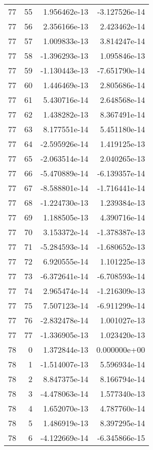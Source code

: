 \begin{tabular}{rrrr}
  77 &   55 &  1.956462e-13 & -3.127526e-14 \\
  77 &   56 &  2.356166e-13 &  2.423462e-14 \\
  77 &   57 &  1.009833e-13 &  3.814247e-14 \\
  77 &   58 & -1.396293e-13 &  1.095846e-13 \\
  77 &   59 & -1.130443e-13 & -7.651790e-14 \\
  77 &   60 &  1.446469e-13 &  2.805686e-14 \\
  77 &   61 &  5.430716e-14 &  2.648568e-14 \\
  77 &   62 &  1.438282e-13 &  8.367491e-14 \\
  77 &   63 &  8.177551e-14 &  5.451180e-14 \\
  77 &   64 & -2.595926e-14 &  1.419125e-13 \\
  77 &   65 & -2.063514e-14 &  2.040265e-13 \\
  77 &   66 & -5.470889e-14 & -6.139357e-14 \\
  77 &   67 & -8.588801e-14 & -1.716441e-14 \\
  77 &   68 & -1.224730e-13 &  1.239384e-13 \\
  77 &   69 &  1.188505e-13 &  4.390716e-14 \\
  77 &   70 &  3.153372e-14 & -1.378387e-13 \\
  77 &   71 & -5.284593e-14 & -1.680652e-13 \\
  77 &   72 &  6.920555e-14 &  1.101225e-13 \\
  77 &   73 & -6.372641e-14 & -6.708593e-14 \\
  77 &   74 &  2.965474e-14 & -1.216309e-13 \\
  77 &   75 &  7.507123e-14 & -6.911299e-14 \\
  77 &   76 & -2.832478e-14 &  1.001027e-13 \\
  77 &   77 & -1.336905e-13 &  1.023420e-13 \\
  78 &    0 &  1.372844e-13 &  0.000000e+00 \\
  78 &    1 & -1.514007e-13 &  5.596934e-14 \\
  78 &    2 &  8.847375e-14 &  8.166794e-14 \\
  78 &    3 & -4.478063e-14 &  1.577340e-13 \\
  78 &    4 &  1.652070e-13 &  4.787760e-14 \\
  78 &    5 &  1.486919e-13 &  8.397295e-14 \\
  78 &    6 & -4.122669e-14 & -6.345866e-15 \\

\end{tabular}
